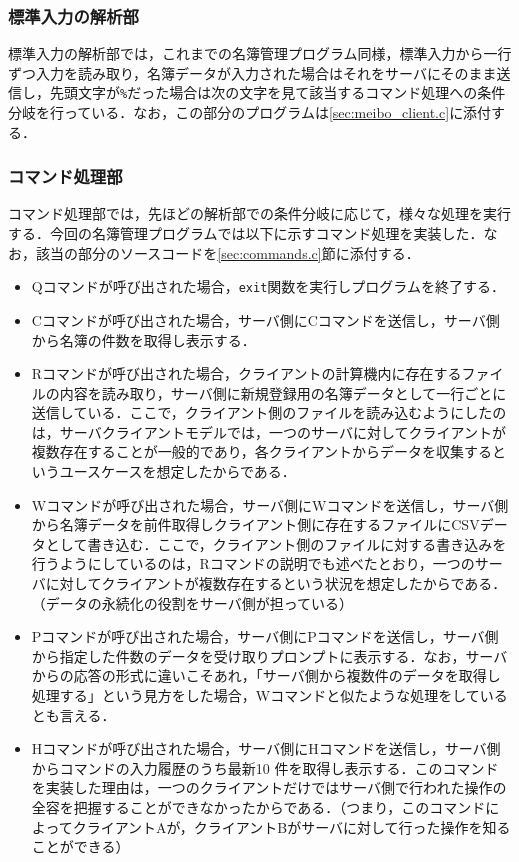 \documentclass[11pt]{jsarticle}
\begin{document}
\subsubsection{標準入力の解析部}

標準入力の解析部では，これまでの名簿管理プログラム同様，標準入力から一行ずつ入力を読み取り，名簿データが入力された場合はそれをサーバにそのまま送信し，先頭文字が{\tt \%}だった場合は次の文字を見て該当するコマンド処理への条件分岐を行っている．なお，この部分のプログラムは\ref{sec:meibo_client.c}に添付する．

\subsubsection{コマンド処理部}

コマンド処理部では，先ほどの解析部での条件分岐に応じて，様々な処理を実行する．今回の名簿管理プログラムでは以下に示すコマンド処理を実装した．なお，該当の部分のソースコードを\ref{sec:commands.c}節に添付する．

\begin{itemize}
      \item Qコマンドが呼び出された場合，{\tt exit}関数を実行しプログラムを終了する．
      \item Cコマンドが呼び出された場合，サーバ側にCコマンドを送信し，サーバ側から名簿の件数を取得し表示する．
      \item Rコマンドが呼び出された場合，クライアントの計算機内に存在するファイルの内容を読み取り，サーバ側に新規登録用の名簿データとして一行ごとに送信している．ここで，クライアント側のファイルを読み込むようにしたのは，サーバクライアントモデルでは，一つのサーバに対してクライアントが複数存在することが一般的であり，各クライアントからデータを収集するというユースケースを想定したからである．
      \item Wコマンドが呼び出された場合，サーバ側にWコマンドを送信し，サーバ側から名簿データを前件取得しクライアント側に存在するファイルにCSVデータとして書き込む．ここで，クライアント側のファイルに対する書き込みを行うようにしているのは，Rコマンドの説明でも述べたとおり，一つのサーバに対してクライアントが複数存在するという状況を想定したからである．（データの永続化の役割をサーバ側が担っている）
      \item Pコマンドが呼び出された場合，サーバ側にPコマンドを送信し，サーバ側から指定した件数のデータを受け取りプロンプトに表示する．なお，サーバからの応答の形式に違いこそあれ，「サーバ側から複数件のデータを取得し処理する」という見方をした場合，Wコマンドと似たような処理をしているとも言える．
      \item Hコマンドが呼び出された場合，サーバ側にHコマンドを送信し，サーバ側からコマンドの入力履歴のうち最新10
      件を取得し表示する．このコマンドを実装した理由は，一つのクライアントだけではサーバ側で行われた操作の全容を把握することができなかったからである．（つまり，このコマンドによってクライアントAが，クライアントBがサーバに対して行った操作を知ることができる）
\end{itemize}
\end{document}
